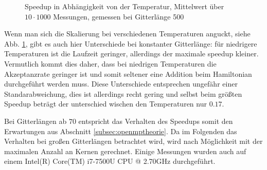 	
	\begin{figure}[htbp]
		
		\caption[Speedup in Abhängigkeit von der Temperatur]{Speedup in Abhängigkeit von der Temperatur, Mittelwert über $10 \cdot 1000$ Messungen, gemessen bei Gitterlänge 500}
		\label{fig:skalierungtemp}
	\end{figure}
		
	Wenn man sich die Skalierung bei verschiedenen Temperaturen anguckt, siehe Abb. \ref{fig:skalierungtemp}, gibt es auch hier Unterschiede bei konstanter Gitterlänge: für niedrigere Temperaturen ist die Laufzeit geringer, allerdings der maximale speedup kleiner. Vermutlich kommt dies daher, dass bei niedrigen Temperaturen die Akzeptanzrate geringer ist und somit seltener eine Addition beim Hamiltonian durchgeführt werden muss. Diese Unterschiede entsprechen ungefähr einer Standarabweichung, dies ist allerdings recht gering und selbst beim größten Speedup beträgt der unterschied wischen den Temperaturen nur $\num{0,17}$.
	
	Bei Gitterlängen ab $70$ entspricht das Verhalten des Speedups somit den Erwartungen aus Abschnitt \ref{subsec:openmptheorie}. Da im Folgenden das Verhalten bei großen Gitterlängen betrachtet wird, wird nach Möglichkeit mit der maximalen Anzahl an Kernen gerechnet. Einige Messungen wurden auch auf einem Intel(R) Core(TM) i7-7500U CPU @ 2.70GHz durchgeführt.

	
	
	
